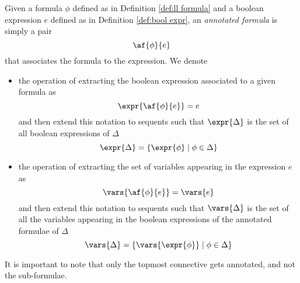 \begin{define}
	\label{def:annotated}
	Given a formula $\phi$ defined as in Definition \ref{def:ll formula} and a boolean expression $e$ defined as in Definition \ref{def:bool expr}, an \textit{annotated formula} is simply a pair
	$$ \af{\phi}{e} $$
	that associates the formula to the expression.
	We denote 
	\begin{itemize}
		\item the operation of extracting the boolean expression associated to a given formula as
			$$ \expr{\af{\phi}{e}} = e $$
			and then extend this notation to sequents such that $ \expr{\Delta} $ is the set of all boolean expressions of $\Delta$
			$$ \expr{\Delta} = \{ \expr{\phi} \mid \phi \in \Delta \} $$
		\item the operation of extracting the set of variables appearing in the expression $e$ as
			$$\vars{\af{\phi}{e}} = \vars{e} $$
			and then extend this notation to sequents such that $\vars{\Delta}$ is the set of all the variables appearing in the boolean expressions of the annotated formulae of $\Delta$
			$$ \vars{\Delta} = \{ \vars{\expr{\phi}} \mid \phi \in \Delta \} $$
	\end{itemize}
\end{define}
It is important to note that only the topmost connective gets annotated, and not the sub-formulae.

